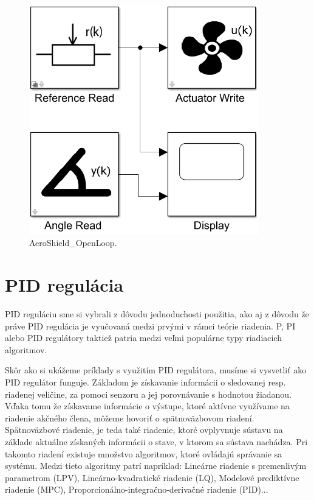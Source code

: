\begin{figure}[!tbh]
	\centering
	\includegraphics[width=100mm]{obr/AeroOpenLoop.png}
	\caption{AeroShield\_OpenLoop.}\label{OBRAZOK 2.6.111}
\end{figure}



\chapter{PID regulácia}
\label{PIDPID}

PID reguláciu sme si vybrali z dôvodu jednoduchosti použitia, ako aj z dôvodu že práve PID regulácia je vyučovaná medzi prvými v rámci teórie riadenia. P, PI alebo PID regulátory taktiež patria medzi veľmi populárne typy riadiacich algoritmov.  

Skôr ako si ukážeme príklady s využitím PID regulátora, musíme si vysvetliť ako PID regulátor funguje. Základom je získavanie informácii o sledovanej resp. riadenej veličine, za pomoci senzoru a jej porovnávanie s hodnotou žiadanou. Vďaka tomu že získavame informácie o výstupe, ktoré aktívne využívame na riadenie akčného člena, môžeme hovoriť o spätnoväzbovom riadení. Spätnoväzbové riadenie, je teda také riadenie, ktoré ovplyvnuje sústavu na základe aktuálne získaných informácii o stave, v ktorom sa sústava nachádza. Pri takomto riadení existuje množstvo algoritmov, ktoré ovládajú správanie sa systému. Medzi tieto algoritmy patrí napríklad: Lineárne riadenie s premenlivým parametrom (LPV), Lineárno-kvadratické riadenie (LQ), Modelové prediktívne riadenie (MPC), Proporcionálno-integračno-derivačné riadenie (PID)...


